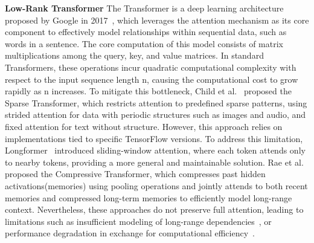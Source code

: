 \documentclass[letterpaper,twocolumn,10pt]{article}
\begin{document}
\textbf{Low-Rank Transformer}
The Transformer is a deep learning architecture proposed by Google in 2017~\cite{OriginalTransformer}, which leverages the attention mechanism as its core component to effectively model relationships within sequential data, such as words in a sentence. 
The core computation of this model consists of matrix multiplications among the query, key, and value matrices. In standard Transformers, these operations incur quadratic computational complexity with respect to the input sequence length n, causing the computational cost to grow rapidly as n increases. To mitigate this bottleneck, Child et al.~\cite{SparseTransformer} proposed the Sparse Transformer, which restricts attention to predefined sparse patterns, using strided attention for data with periodic structures such as images and audio, and fixed attention for text without structure. However, this approach relies on implementations tied to specific TensorFlow versions. To address this limitation, Longformer~\cite{Longformer} introduced sliding-window attention, where each token attends only to nearby tokens, providing a more general and maintainable solution. Rae et al.~\cite{CompressiveTransformer} proposed the Compressive Transformer, which compresses past hidden activations(memories) using pooling operations and jointly attends to both recent memories and compressed long-term memories to efficiently model long-range context. Nevertheless, these approaches do not preserve full attention, leading to limitations such as insufficient modeling of long-range dependencies~\cite{SparseTransformer, Longformer}, or performance degradation in exchange for computational efficiency~\cite{Longformer}.
\end{document}
